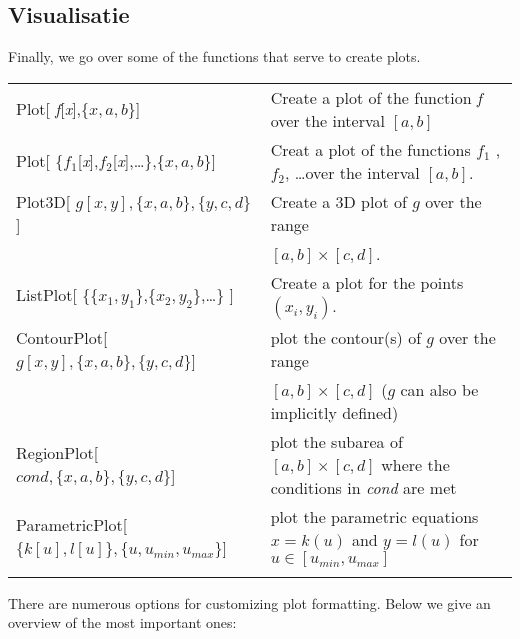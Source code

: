 

\subsection{Visualisatie}
Finally, we go over some of the functions that serve to create plots.

\begin{tabular}{>{\hfill}p{8cm}p{9cm}}
	Plot[ \textit{f}[\textit{x}],\{$x,a,b$\}] 					&	Create a plot of the function \textit{f} over the interval $[a,b]$\\
	
	Plot[ \{$f_1$[\textit{x}],$f_2$[\textit{x}],\ldots\},\{$x,a,b$\}] 	&	Creat a plot of the functions $f_1$ , $f_2$, \ldots over the interval $[a,b]$.\\
	
	Plot3D[ $g[x, y],\{x,a,b\},\{y,c,d\}$]		&	Create a 3D plot of $g$ over the range \\&
	$[a,b]\times[c,d]$.\\
	ListPlot[ \{\{$x_1,y_1$\},\{$x_2,y_2$\},\ldots\} ] 		&	Create a plot for the points $(x_i, y_i)$.\\
	
	ContourPlot[ $g[x, y],\{x,a,b\},\{y,c,d\}$]	&	plot the contour(s) of $g$ over the range\\
	& $[a,b]\times[c,d]$ ($g$ can also be implicitly defined)\\
	RegionPlot[ $cond,\{x,a,b\},\{y,c,d\}$]	&	plot the subarea of $[a,b]\times[c,d]$ where the conditions in \textit{cond} are met\\
	
	ParametricPlot[ $\{k[u],l[u]\},\{u,u_{min},u_{max}\}$]	&	plot the parametric equations  $x = k(u)$ and $y =l(u)$ for $u\in[u_{min},u_{max}]$\\
	
	\multicolumn{2}{l}{} 
\end{tabular}

There are numerous options for customizing plot formatting.  Below we give an overview of the most important ones:


